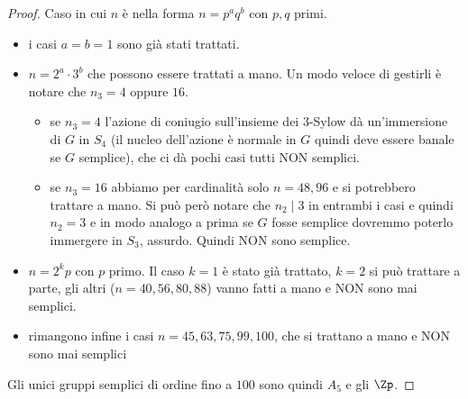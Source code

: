 \begin{proof}
    Caso in cui $n$ è nella forma $n = p^aq^b$ con $p,q$ primi.
    \begin{itemize}
        \item i casi $a = b = 1$ sono già stati trattati.
        \item $n = 2^a \cdot 3^b$ che possono essere trattati a mano. Un modo veloce di gestirli è notare che $n_3 = 4$ oppure $16$. 
        \begin{itemize}
        \item se $n_3 = 4$ l'azione di coniugio sull'insieme dei $3$-Sylow dà un'immersione di $G$ in $S_4$ (il nucleo dell'azione è normale in $G$ quindi deve essere banale se $G$ semplice), che ci dà pochi casi tutti NON semplici.
        \item se $n_3 = 16$ abbiamo per cardinalità solo $n = 48,96$ e si potrebbero trattare a mano. Si può però notare che $n_2  \mid  3$ in entrambi i casi e quindi $n_2 = 3$ e in modo analogo a prima se $G$ fosse semplice dovremmo poterlo immergere in $S_3$, assurdo. Quindi NON sono semplice.
    \end{itemize} 
        \item $n = 2^kp$ con $p$ primo. Il caso $k=1$ è stato già trattato, $k = 2$ si può trattare a parte, gli altri ($n = 40,56,80,88$) vanno fatti a mano e NON sono mai semplici.
        \item rimangono infine i casi $n = 45,63,75,99,100$, che si trattano a mano e NON sono mai semplici
    \end{itemize}
    
    Gli unici gruppi semplici di ordine fino a $100$ sono quindi $A_5$ e gli $\Zp$.
\end{proof}


